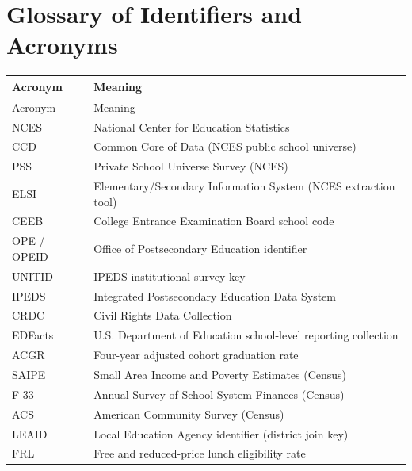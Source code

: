 \documentclass[12pt]{article}
\begin{document}
\newpage
\singlespacing
\printbibliography[title={References}]
\doublespacing

\newpage
\appendix
\singlespacing

\section{Glossary of Identifiers and Acronyms}
\label{app:glossary}

{\small
\begin{longtable}{@{}ll@{}}
\toprule
Acronym & Meaning \\
\midrule
\endfirsthead
\toprule
Acronym & Meaning \\
\midrule
\endhead
NCES & National Center for Education Statistics \\
CCD & Common Core of Data (NCES public school universe) \\
PSS & Private School Universe Survey (NCES) \\
ELSI & Elementary/Secondary Information System (NCES extraction tool) \\
CEEB & College Entrance Examination Board school code \\
OPE / OPEID & Office of Postsecondary Education identifier \\
UNITID & IPEDS institutional survey key \\
IPEDS & Integrated Postsecondary Education Data System \\
CRDC & Civil Rights Data Collection \\
EDFacts & U.S. Department of Education school-level reporting collection \\
ACGR & Four-year adjusted cohort graduation rate \\
SAIPE & Small Area Income and Poverty Estimates (Census) \\
F-33 & Annual Survey of School System Finances (Census) \\
ACS & American Community Survey (Census) \\
LEAID & Local Education Agency identifier (district join key) \\
FRL & Free and reduced-price lunch eligibility rate \\

\end{longtable}}
\end{document}
